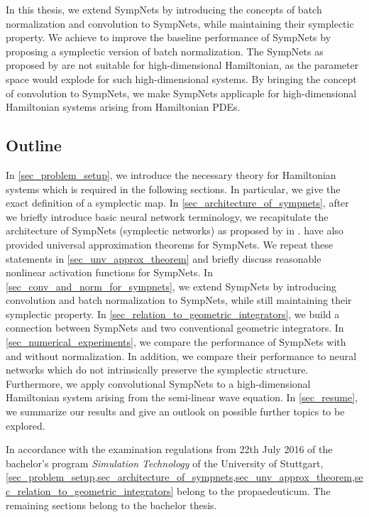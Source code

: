 \documentclass[twoside,a4paper]{article}
\begin{document}
In this thesis, we extend SympNets by introducing
the concepts of batch normalization and convolution to SympNets,
while maintaining their symplectic property. We achieve to
improve the baseline performance of SympNets by proposing a symplectic
version of batch normalization. 
The SympNets as proposed by \citeauthor{Jin2020} are not suitable for high-dimensional 
Hamiltonian, as the parameter space would explode for
such high-dimensional systems. By bringing the concept of convolution
to SympNets, we make SympNets applicaple for high-dimensional
Hamiltonian systems arising from Hamiltonian PDEs.

\subsection{Outline}

In \cref{sec_problem_setup}, we introduce the necessary theory for Hamiltonian systems
which is required in the following sections. In particular, we give the exact
definition of a symplectic map.
In \cref{sec_architecture_of_sympnets}, after we briefly introduce basic neural network terminology,
we recapitulate the architecture of SympNets (symplectic networks)
as proposed by \citeauthor{Jin2020} in \cite{Jin2020}.
\citeauthor{Jin2020} have also provided universal approximation theorems for SympNets.
We repeat these statements in \cref{sec_unv_approx_theorem} and briefly discuss 
reasonable nonlinear activation functions for SympNets.
In \cref{sec_conv_and_norm_for_sympnets}, we extend SympNets by introducing
convolution and batch normalization to SympNets,
while still maintaining their symplectic property.
In \cref{sec_relation_to_geometric_integrators}, we build a connection 
between SympNets and two conventional geometric integrators.
In \cref{sec_numerical_experiments}, we compare the performance of SympNets 
with and without normalization. In addition, we compare their performance to neural 
networks which do not intrinsically preserve the symplectic structure. 
Furthermore, we apply convolutional SympNets to a high-dimensional Hamiltonian system 
arising from the semi-linear wave equation.
In \cref{sec_resume}, we summarize our results and give an outlook on possible further 
topics to be explored.

In accordance with the examination regulations from 22th July 2016 of the bachelor's program 
\emph{Simulation Technology} of the University of Stuttgart, 
\cref{sec_problem_setup,sec_architecture_of_sympnets,sec_unv_approx_theorem,sec_relation_to_geometric_integrators} 
belong to the propaedeuticum. The remaining sections belong to the bachelor thesis.
\end{document}
